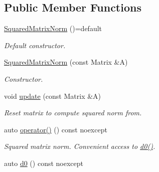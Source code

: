 \subsection*{Public Member Functions}
\begin{DoxyCompactItemize}
\item 
\hypertarget{structFunG_1_1LinearAlgebra_1_1SquaredMatrixNorm_a2412ac12a186f31016e8c237bc06e469}{\hyperlink{structFunG_1_1LinearAlgebra_1_1SquaredMatrixNorm_a2412ac12a186f31016e8c237bc06e469}{Squared\-Matrix\-Norm} ()=default}\label{structFunG_1_1LinearAlgebra_1_1SquaredMatrixNorm_a2412ac12a186f31016e8c237bc06e469}

\begin{DoxyCompactList}\small\item\em Default constructor. \end{DoxyCompactList}\item 
\hyperlink{structFunG_1_1LinearAlgebra_1_1SquaredMatrixNorm_ae4062ab3c66095747e176438d17dfcad}{Squared\-Matrix\-Norm} (const Matrix \&A)
\begin{DoxyCompactList}\small\item\em Constructor. \end{DoxyCompactList}\item 
\hypertarget{structFunG_1_1LinearAlgebra_1_1SquaredMatrixNorm_a6843d67b31b7150dd9b920586c87b495}{void \hyperlink{structFunG_1_1LinearAlgebra_1_1SquaredMatrixNorm_a6843d67b31b7150dd9b920586c87b495}{update} (const Matrix \&A)}\label{structFunG_1_1LinearAlgebra_1_1SquaredMatrixNorm_a6843d67b31b7150dd9b920586c87b495}

\begin{DoxyCompactList}\small\item\em Reset matrix to compute squared norm from. \end{DoxyCompactList}\item 
\hypertarget{structFunG_1_1LinearAlgebra_1_1SquaredMatrixNorm_a1c081769e7750c8ca9a8ad435499b33d}{auto \hyperlink{structFunG_1_1LinearAlgebra_1_1SquaredMatrixNorm_a1c081769e7750c8ca9a8ad435499b33d}{operator()} () const noexcept}\label{structFunG_1_1LinearAlgebra_1_1SquaredMatrixNorm_a1c081769e7750c8ca9a8ad435499b33d}

\begin{DoxyCompactList}\small\item\em Squared matrix norm. Convenient access to \hyperlink{structFunG_1_1LinearAlgebra_1_1SquaredMatrixNorm_a6bd5eef8bd93c351fbd6d8b31b4f972c}{d0()}. \end{DoxyCompactList}\item 
\hypertarget{structFunG_1_1LinearAlgebra_1_1SquaredMatrixNorm_a6bd5eef8bd93c351fbd6d8b31b4f972c}{auto \hyperlink{structFunG_1_1LinearAlgebra_1_1SquaredMatrixNorm_a6bd5eef8bd93c351fbd6d8b31b4f972c}{d0} () const noexcept}\label{structFunG_1_1LinearAlgebra_1_1SquaredMatrixNorm_a6bd5eef8bd93c351fbd6d8b31b4f972c}


\end{DoxyCompactItemize}
